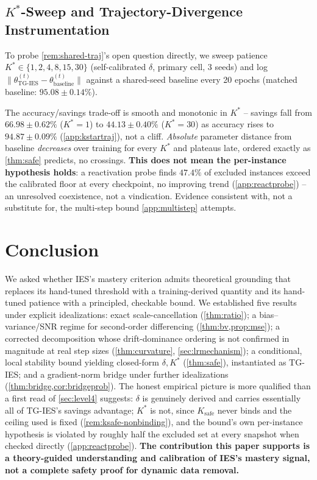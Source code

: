 \documentclass{article}
\theoremstyle{plain}
\theoremstyle{definition}
\theoremstyle{remark}
\begin{document}
\subsection{$K^*$-Sweep and Trajectory-Divergence Instrumentation}
\label{sec:kstartraj}

To probe \cref{rem:shared-traj}'s open question directly, we sweep patience $K^*\in\{1,2,4,8,15,30\}$ (self-calibrated $\delta$, primary cell, 3 seeds) and log $\|\theta^{(t)}_{\mathrm{TG\text{-}IES}}-\theta^{(t)}_{\mathrm{baseline}}\|$ against a shared-seed baseline every 20 epochs (matched baseline: $95.08\pm0.14\%$).

The accuracy/savings trade-off is smooth and monotonic in $K^*$ -- savings fall from $66.98\pm0.62\%$ ($K^*{=}1$) to $44.13\pm0.40\%$ ($K^*{=}30$) as accuracy rises to $94.87\pm0.09\%$ (\cref{app:kstartraj}), not a cliff. \emph{Absolute} parameter distance from baseline \emph{decreases} over training for every $K^*$ and plateaus late, ordered exactly as \cref{thm:safe} predicts, no crossings. \textbf{This does not mean the per-instance hypothesis holds}: a reactivation probe finds $47.4\%$ of excluded instances exceed the calibrated floor at every checkpoint, no improving trend (\cref{app:reactprobe}) -- an unresolved coexistence, not a vindication. Evidence consistent with, not a substitute for, the multi-step bound \cref{app:multistep} attempts.

\section{Conclusion}
\label{sec:conclusion}

We asked whether IES's mastery criterion admits theoretical grounding that replaces its hand-tuned threshold with a training-derived quantity and its hand-tuned patience with a principled, checkable bound. We established five results under explicit idealizations: exact scale-cancellation (\cref{thm:ratio}); a bias--variance/SNR regime for second-order differencing (\cref{thm:bv,prop:mse}); a corrected decomposition whose drift-dominance ordering is not confirmed in magnitude at real step sizes (\cref{thm:curvature}, \cref{sec:lrmechanism}); a conditional, local stability bound yielding closed-form $\delta,K^*$ (\cref{thm:safe}), instantiated as TG-IES; and a gradient-norm bridge under further idealizations (\cref{thm:bridge,cor:bridgeprob}). The honest empirical picture is more qualified than a first read of \cref{sec:level4} suggests: $\delta$ is genuinely derived and carries essentially all of TG-IES's savings advantage; $K^*$ is not, since $K_{\mathrm{safe}}$ never binds and the ceiling used is fixed (\cref{rem:ksafe-nonbinding}), and the bound's own per-instance hypothesis is violated by roughly half the excluded set at every snapshot when checked directly (\cref{app:reactprobe}). \textbf{The contribution this paper supports is a theory-guided understanding and calibration of IES's mastery signal, not a complete safety proof for dynamic data removal.}
\end{document}
